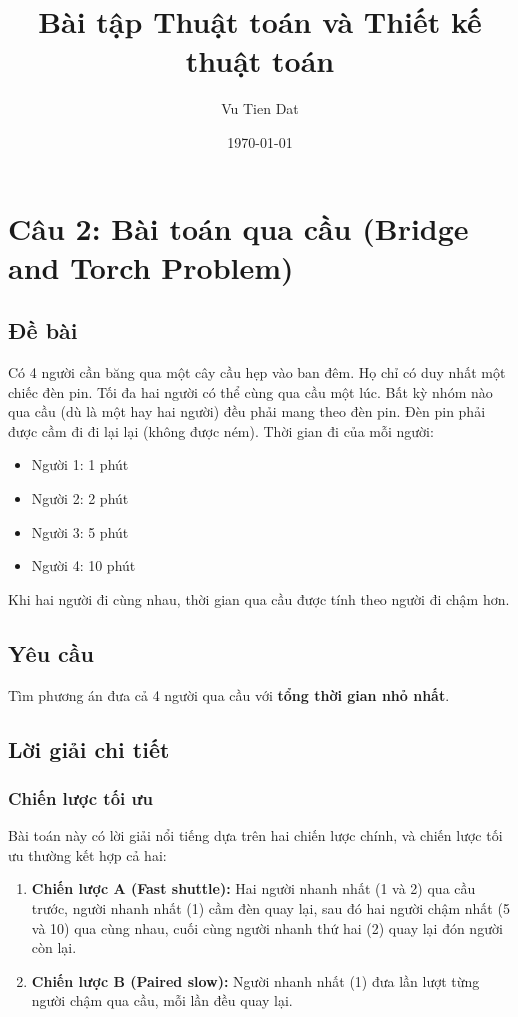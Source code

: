 \documentclass[12pt,a4paper]{article}
\title{Bài tập Thuật toán và Thiết kế thuật toán}
\author{Vu Tien Dat}
\date{\today}
\begin{document}
\maketitle

\section*{Câu 2: Bài toán qua cầu (Bridge and Torch Problem)}

\subsection*{Đề bài}
Có 4 người cần băng qua một cây cầu hẹp vào ban đêm. Họ chỉ có duy nhất một chiếc đèn pin. Tối đa hai người có thể cùng qua cầu một lúc. Bất kỳ nhóm nào qua cầu (dù là một hay hai người) đều phải mang theo đèn pin. Đèn pin phải được cầm đi đi lại lại (không được ném). Thời gian đi của mỗi người:
\begin{itemize}
    \item Người 1: 1 phút
    \item Người 2: 2 phút
    \item Người 3: 5 phút
    \item Người 4: 10 phút
\end{itemize}
Khi hai người đi cùng nhau, thời gian qua cầu được tính theo người đi chậm hơn.

\subsection*{Yêu cầu}
Tìm phương án đưa cả 4 người qua cầu với \textbf{tổng thời gian nhỏ nhất}.

\subsection*{Lời giải chi tiết}

\subsubsection*{Chiến lược tối ưu}
Bài toán này có lời giải nổi tiếng dựa trên hai chiến lược chính, và chiến lược tối ưu thường kết hợp cả hai:

\begin{enumerate}
    \item \textbf{Chiến lược A (Fast shuttle):} 
    Hai người nhanh nhất (1 và 2) qua cầu trước, người nhanh nhất (1) cầm đèn quay lại, sau đó hai người chậm nhất (5 và 10) qua cùng nhau, cuối cùng người nhanh thứ hai (2) quay lại đón người còn lại.
    
    \item \textbf{Chiến lược B (Paired slow):} 
    Người nhanh nhất (1) đưa lần lượt từng người chậm qua cầu, mỗi lần đều quay lại.
\end{enumerate}
\end{document}
